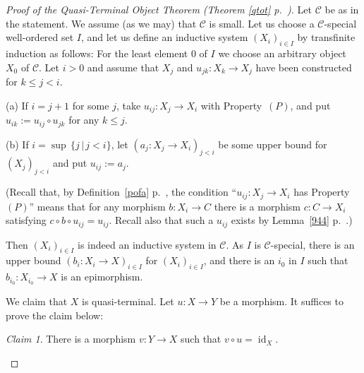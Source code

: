 \documentclass[12pt]{article}
\theoremstyle{remark}
\newtheorem{claim}[thm]{Claim}
\theoremstyle{definition}
\newcommand{\nn}{\noindent}
\newcommand{\C}{\mathcal C}
\DeclareMathOperator{\id}{id}
\begin{document}
\begin{proof}[Proof of the Quasi-Terminal Object Theorem (Theorem \ref{qtot} p.~\pageref{qtot})] 
Let $\C$ be as in the statement. We assume (as we may) that $\C$ is small. Let us choose a $\C$-special well-ordered set $I$, and let us define an inductive system $(X_i)_{i\in I}$ by transfinite induction as follows: For the least element $0$ of $I$ we choose an arbitrary object $X_0$ of $\C$. Let $i>0$ and assume that $X_j$ and $u_{jk}:X_k\to X_j$ have been constructed for $k\le j<i$. 

\nn(a) If $i=j+1$ for some $j$, take $u_{ij}:X_j\to X_i$ with Property~$(P)$, and put $u_{ik}:=u_{ij}\circ u_{jk}$ for any $k\le j$. 

\nn(b) If $i=\sup\,\{j\,|\,j<i\}$, let $(a_j:X_j\to X_i)_{j<i}$ be some upper bound for $(X_j)_{j<i}$ and put $u_{ij}:=a_j$. 

(Recall that, by Definition~\ref{pofa} p.~\pageref{pofa}, the condition ``$u_{ij}:X_j\to X_i$ has Property~$(P)$'' means that for any morphism $b:X_i\to C$ there is a morphism $c:C\to X_i$ satisfying $c\circ b\circ u_{ij}=u_{ij}$. Recall also that such a $u_{ij}$ exists by Lemma~\ref{944} p.~\pageref{944}.) 

Then $(X_i)_{i\in I}$ is indeed an inductive system in $\C$. As $I$ is $\C$-special, there is an upper bound $(b_i:X_i\to X)_{i\in I}$ for $(X_i)_{i\in I}$, and there is an $i_0$ in $I$ such that $b_{i_0}:X_{i_0}\to X$ is an epimorphism. 

We claim that $X$ is quasi-terminal. Let $u:X\to Y$ be a morphism. It suffices to prove the claim below: 
%
\begin{claim}\label{cqt}
There is a morphism $v:Y\to X$ such that $v\circ u=\id_X$. 
\end{claim} 


\end{proof}
\end{document}
